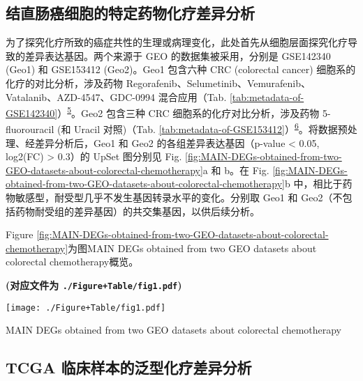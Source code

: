 \documentclass[
]{article}
\begin{document}
\hypertarget{cellDiff}{%
\subsection{结直肠癌细胞的特定药物化疗差异分析}\label{cellDiff}}

为了探究化疗所致的癌症共性的生理或病理变化，此处首先从细胞层面探究化疗导致的差异表达基因。两个来源于 GEO 的数据集被采用，分别是 GSE142340 (Geo1) 和 GSE153412 (Geo2)。Geo1 包含六种 CRC (colorectal cancer) 细胞系的化疗的对比分析，涉及药物 Regorafenib、Selumetinib、Vemurafenib、Vatalanib、AZD-4547、GDC-0994 混合应用（Tab. \ref{tab:metadata-of-GSE142340}）\textsuperscript{\protect\hyperlink{ref-OptimizedLowDZoetem2020}{5}}。Geo2 包含三种 CRC 细胞系的化疗对比分析，涉及药物 5-fluorouracil (和 Uracil 对照)（Tab. \ref{tab:metadata-of-GSE153412}）\textsuperscript{\protect\hyperlink{ref-DownregulationChauvi2022}{6}}。将数据预处理、经差异分析后，Geo1 和 Geo2 的各组差异表达基因（p-value \textless{} 0.05, \textbar log2(FC)\textbar{} \textgreater{} 0.3）的 UpSet 图分别见 Fig. \ref{fig:MAIN-DEGs-obtained-from-two-GEO-datasets-about-colorectal-chemotherapy}a 和 b。在 Fig. \ref{fig:MAIN-DEGs-obtained-from-two-GEO-datasets-about-colorectal-chemotherapy}b 中，相比于药物敏感型，耐受型几乎不发生基因转录水平的变化。分别取 Geo1 和 Geo2（不包括药物耐受组的差异基因）的共交集基因，以供后续分析。

Figure \ref{fig:MAIN-DEGs-obtained-from-two-GEO-datasets-about-colorectal-chemotherapy}为图MAIN DEGs obtained from two GEO datasets about colorectal chemotherapy概览。

\textbf{(对应文件为 \texttt{./Figure+Table/fig1.pdf})}

\def\@captype{figure}
\begin{center}
\texttt{[image: ./Figure+Table/fig1.pdf]}
\caption{MAIN DEGs obtained from two GEO datasets about colorectal chemotherapy}\label{fig:MAIN-DEGs-obtained-from-two-GEO-datasets-about-colorectal-chemotherapy}
\end{center}

\hypertarget{tcgaDiff}{%
\subsection{TCGA 临床样本的泛型化疗差异分析}\label{tcgaDiff}}
\end{document}
